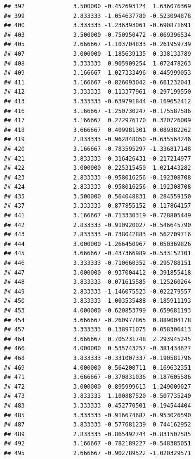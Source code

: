 \documentclass[
]{article}
\begin{document}
\begin{verbatim}
## 392              3.500000 -0.452693124  1.636076369
## 399              2.833333 -1.054637780 -0.523094878
## 400              3.333333 -1.236393061 -0.690871691
## 403              3.500000 -0.750950472 -0.069396534
## 405              2.666667 -1.103704833 -0.261959739
## 407              3.000000 -1.185639135  0.338133789
## 408              3.333333  0.905909254  1.072478263
## 409              3.166667 -1.027333496 -0.445999053
## 411              3.166667 -0.826093042 -0.661232041
## 412              3.333333  0.113377961 -0.297199550
## 413              3.333333 -0.639791844 -0.169652412
## 416              3.166667 -1.250730247 -0.175587586
## 417              3.166667  0.272976170  0.320726009
## 418              3.666667  0.409981301  0.089382262
## 419              2.833333 -0.962848050 -0.635564246
## 420              3.166667 -0.783595297 -1.336817148
## 421              3.833333 -0.316426431 -0.217214977
## 422              3.000000  0.225315450  1.021443282
## 423              2.833333 -0.958016256 -0.192308708
## 424              2.833333 -0.958016256 -0.192308708
## 435              3.500000  0.564048831  0.284559150
## 437              3.333333 -0.877855152  0.117864157
## 441              3.166667 -0.713330319 -0.728805449
## 442              2.833333 -0.910920027 -0.546645790
## 443              2.833333 -0.738042883 -0.562709716
## 444              3.000000 -1.266450967  0.050369826
## 445              3.666667 -0.437366989 -0.533152101
## 446              3.333333 -0.710660352 -0.295788151
## 447              3.000000 -0.937004412 -0.391855418
## 448              3.833333 -0.071615585  0.125260264
## 449              2.833333 -1.146075523 -0.022279557
## 450              3.833333 -1.003535488 -0.185911193
## 453              4.000000 -0.620853799  0.659681193
## 454              3.666667 -0.260977865  0.889004178
## 457              3.333333  0.138971075  0.058306413
## 464              3.666667  0.705231748  2.293945245
## 466              4.000000  0.535743257 -0.381434627
## 468              3.833333 -0.331007337 -0.190581796
## 469              4.000000 -0.564200711  0.169632351
## 471              3.666667 -0.370831036  0.187605586
## 472              3.000000  0.895999613 -1.249009027
## 473              3.833333  1.100887520 -0.507735240
## 483              3.333333  0.452770501 -0.194544404
## 485              3.333333 -0.916674687 -0.953026590
## 487              3.833333 -0.577681239  0.744162952
## 489              2.833333 -0.865492744 -0.831507585
## 492              3.166667 -0.782189227 -0.548385051
## 495              2.666667 -0.902789522 -1.020329571

\end{verbatim}
\end{document}
